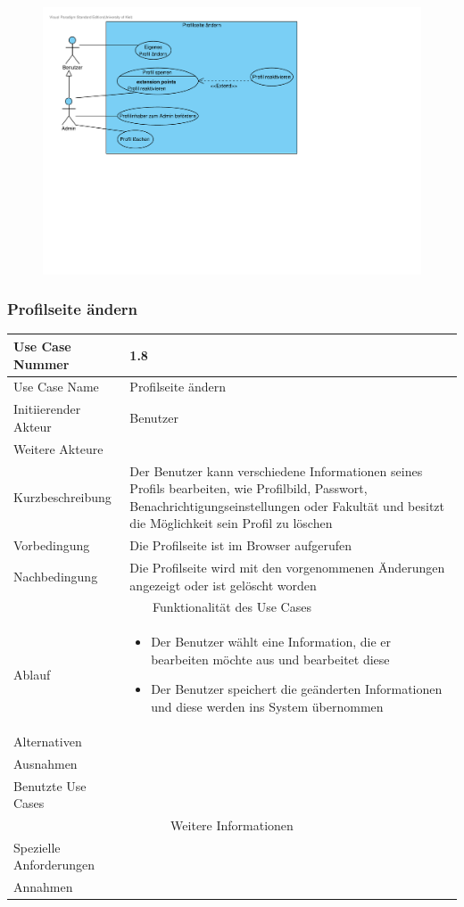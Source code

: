 \documentclass[10pt,a4paper]{article}
\begin{document}
	\begin{figure}[h!]
		\includegraphics[width=\linewidth]{gfx/webseite/Profilseite.pdf}
	\end{figure}
	\subsubsection{Profilseite \"andern}
		\begin{tabular}{|l|p{.5\linewidth}|}
		\hline Use Case Nummer & 1.8 \\ 
		\hline Use Case Name & Profilseite \"andern \\ 
		\hline Initiierender Akteur & Benutzer \\
		\hline Weitere Akteure & \\
		\hline Kurzbeschreibung & Der Benutzer kann verschiedene Informationen seines Profils bearbeiten, wie Profilbild, Passwort, Benachrichtigungseinstellungen oder Fakultät und besitzt die Möglichkeit sein Profil zu löschen \\
		\hline Vorbedingung & Die Profilseite ist im Browser aufgerufen \\
		\hline Nachbedingung & Die Profilseite wird mit den vorgenommenen \"Anderungen angezeigt oder ist gel\"oscht worden \\
		\hline \multicolumn{2}{|c|}{Funktionalität des Use Cases}\\
		\hline Ablauf & \begin{itemize}
					\item Der Benutzer w\"ahlt eine Information, die er bearbeiten m\"ochte aus und bearbeitet diese
					\item Der Benutzer speichert die ge\"anderten Informationen und diese werden ins System \"ubernommen
				\end{itemize}\\
		\hline Alternativen & \\
		\hline Ausnahmen & \\
		\hline Benutzte Use Cases & \\
		\hline \multicolumn{2}{|c|}{Weitere Informationen} \\
		\hline Spezielle Anforderungen &  \\
		\hline Annahmen &  \\
		\hline
		\end{tabular}
		
\end{document}
